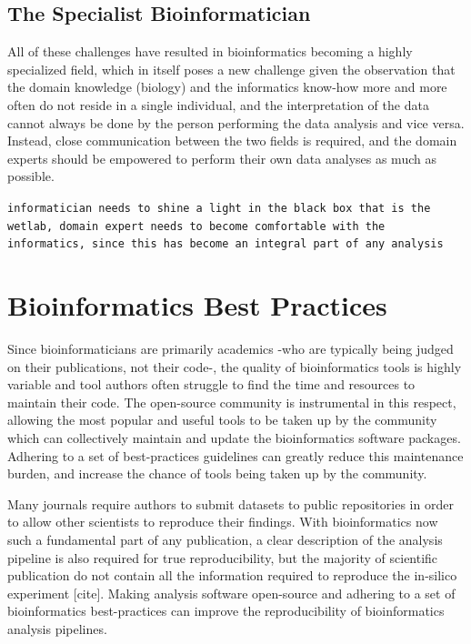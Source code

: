 \subsection{The Specialist Bioinformatician}
All of these challenges have resulted in bioinformatics becoming a highly specialized field, which in itself poses a new challenge given the observation that the domain knowledge (biology) and the informatics know-how more and more often do not reside in a single individual, and the interpretation of the data cannot always be done by the person performing the data analysis and vice versa. Instead, close communication between the two fields is required, and the domain experts should be empowered to perform their own data analyses as much as possible.

\verb+informatician needs to shine a light in the black box that is the wetlab, domain expert needs to become comfortable with the informatics, since this has become an integral part of any analysis+


\section{Bioinformatics Best Practices}
Since bioinformaticians are primarily academics -who are typically being judged on their publications, not their code-, the quality of bioinformatics tools is highly variable and tool authors often struggle to find the time and resources to maintain their code. The open-source community is instrumental in this respect, allowing the most popular and useful tools to be taken up by the community which can collectively maintain and update the bioinformatics software packages. Adhering to a set of best-practices guidelines can greatly reduce this maintenance burden, and increase the chance of tools being taken up by the community.

Many journals require authors to submit datasets to public repositories in order to allow other scientists to reproduce their findings. With bioinformatics now such a fundamental part of any publication, a clear description of the analysis pipeline is also required for true reproducibility, but the majority of scientific publication do not contain all the information required to reproduce the in-silico experiment [cite]. Making analysis software open-source and adhering to a set of bioinformatics best-practices can improve the reproducibility of bioinformatics analysis pipelines.

